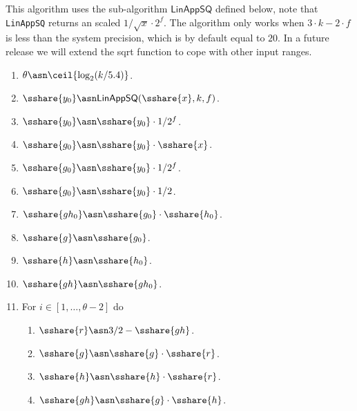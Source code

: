 This algorithm uses the sub-algorithm $\mathsf{LinAppSQ}$ defined below, note that \verb|LinAppSQ| returns an scaled $1/\sqrt{x} \cdot 2^{f}$.
The algorithm only works when $3 \cdot k -2 \cdot f$ is less than the system precision, which is by default equal to $20$.
In a future release we will extend the sqrt function to cope with other input ranges.
\begin{enumerate}
  \item $\theta \asn \ceil{\log_2 (k/5.4)}$.
  \item $\sshare{y_0} \asn \mathsf{LinAppSQ}(\sshare{x},k,f)$.
  \item $\sshare{y_0} \asn \sshare{y_0} \cdot 1/2^{f}$.
  \item $\sshare{g_0} \asn \sshare{y_0} \cdot \sshare{x}$.
  \item $\sshare{g_0} \asn \sshare{y_0} \cdot 1/2^{f}$.
  \item $\sshare{g_0} \asn \sshare{y_0} \cdot 1/2$.
  \item $\sshare{gh_0} \asn \sshare{g_0} \cdot \sshare{h_0}$.
  \item $\sshare{g} \asn \sshare{g_0}$.
  \item $\sshare{h} \asn \sshare{h_0}$.
  \item $\sshare{gh} \asn \sshare{gh_0}$.
  \item For $i \in[1,\ldots,\theta-2]$ do
        \begin{enumerate}
          \item $\sshare{r} \asn 3/2-\sshare{gh}$.
          \item $\sshare{g} \asn \sshare{g} \cdot \sshare{r}$.
          \item $\sshare{h} \asn \sshare{h} \cdot \sshare{r}$.
          \item $\sshare{gh} \asn \sshare{g} \cdot \sshare{h}$.

\end{enumerate}
\end{enumerate}
